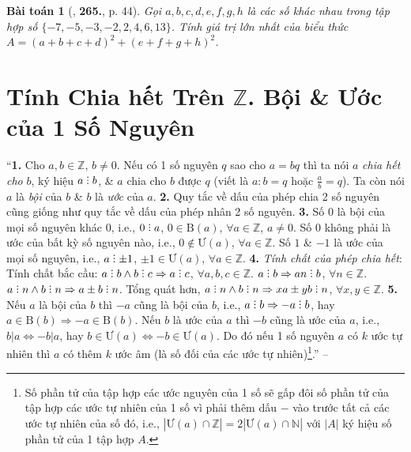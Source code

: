 \documentclass{article}
\numberwithin{equation}{section}
\newtheorem{baitoan}{Bài toán}
\DeclareRobustCommand{\divby}{%
	\mathrel{\vbox{\baselineskip.65ex\lineskiplimit0pt\hbox{.}\hbox{.}\hbox{.}}}%
}
\begin{document}
\begin{baitoan}[\cite{Binh_Toan_6_tap_1}, \textbf{265.}, p. 44]
	Gọi $a,b,c,d,e,f,g,h$ là các số khác nhau trong tập hợp số $\{-7,-5,-3,-2,2,4,6,13\}$. Tính giá trị lớn nhất của biểu thức $A = (a + b + c + d)^2 + (e + f + g + h)^2$.
\end{baitoan}


\section{Tính Chia hết Trên $\mathbb{Z}$. Bội \& Ước của 1 Số Nguyên}
``\textbf{1.} Cho $a,b\in\mathbb{Z}$, $b\ne0$. Nếu có 1 số nguyên $q$ sao cho $a = bq$ thì ta nói $a$ \textit{chia hết cho} $b$, ký hiệu $a\divby b$, \& $a$ chia cho $b$ được $q$ (viết là $a:b = q$ hoặc $\frac{a}{b} = q$). Ta còn nói $a$ là \textit{bội} của $b$ \& $b$ là \textit{ước} của $a$. \textbf{2.} Quy tắc về dấu của phép chia 2 số nguyên cũng giống như quy tắc về dấu của phép nhân 2 số nguyên. \textbf{3.} Số $0$ là bội của mọi số nguyên khác $0$, i.e., $0\divby a$, $0\in\mbox{B}(a)$, $\forall a\in\mathbb{Z}$, $a\ne0$. Số $0$ không phải là ước của bất kỳ số nguyên nào, i.e., $0\notin\mbox{Ư}(a)$, $\forall a\in\mathbb{Z}$. Số $1$ \& $-1$ là ước của mọi số nguyên, i.e., $a\divby\pm1$, $\pm1\in\mbox{Ư}(a)$, $\forall a\in\mathbb{Z}$. \textbf{4.} \textit{Tính chất của phép chia hết}: Tính chất bắc cầu: $a\divby b\land b\divby c\Rightarrow a\divby c$, $\forall a,b,c\in\mathbb{Z}$. $a\divby b\Rightarrow an\divby b$, $\forall n\in\mathbb{Z}$. $a\divby n\land b\divby n\Rightarrow a\pm b\divby n$. Tổng quát hơn, $a\divby n\land b\divby n\Rightarrow xa\pm yb\divby n$, $\forall x,y\in\mathbb{Z}$. \textbf{5.} Nếu $a$ là bội của $b$ thì $-a$ cũng là bội của $b$, i.e., $a\divby b\Rightarrow-a\divby b$, hay $a\in\mbox{B}(b)\Rightarrow-a\in\mbox{B}(b)$. Nếu $b$ là ước của $a$ thì $-b$ cũng là ước của $a$, i.e., $b|a\Leftrightarrow-b|a$, hay $b\in\mbox{Ư}(a)\Leftrightarrow-b\in\mbox{Ư}(a)$. Do đó nếu 1 số nguyên $a$ có $k$ ước tự nhiên thì $a$ có thêm $k$ ước âm (là số đối của các ước tự nhiên)\footnote{Số phần tử của tập hợp các ước nguyên của 1 số sẽ gấp đôi số phần tử của tập hợp các ước tự nhiên của 1 số vì phải thêm dấu $-$ vào trước tất cả các ước tự nhiên của số đó, i.e., $|\mbox{Ư}(a)\cap\mathbb{Z}| = 2|\mbox{Ư}(a)\cap\mathbb{N}|$ với $|A|$ ký hiệu số phần tử của 1 tập hợp $A$.}.'' -- \cite[Chap. II, \S5, p. 42]{Tuyen_Toan_6}
\end{document}
